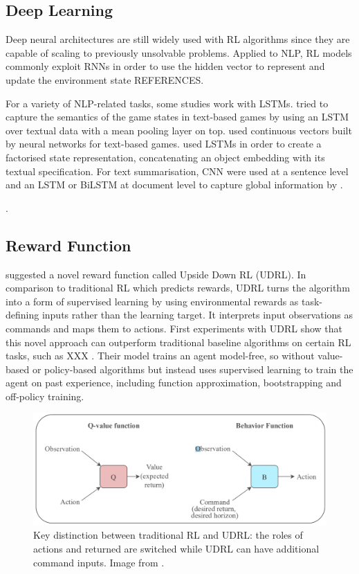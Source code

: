 \documentclass[11pt,a4paper]{article}
\begin{document}
\subsection{Deep Learning}
Deep neural architectures are still widely used with RL algorithms since they are capable of scaling to previously unsolvable problems. Applied to NLP, RL models commonly exploit RNNs in order to use the hidden vector to represent and update the environment state REFERENCES. 

For a variety of NLP-related tasks, some studies work with LSTMs. \citet{narasimhan-etal-2016-improving} tried to capture the semantics of the game states in text-based games by using an LSTM over textual data with a mean pooling layer on top. \citet{he-etal-2016-deep-reinforcement} used continuous vectors built by neural networks for text-based games. \citet{narasimhan-2018} used LSTMs in order to create a factorised state representation, concatenating an object embedding with its textual specification. For text summarisation, CNN were used at a sentence level and an LSTM or BiLSTM at document level to capture global information by \citet{chen-bansal-2018-fast}. 

\citet{yasui-etal-2019, zhang-2018, li-etal-2016-deep, ranzato2015sequence}. 

\subsection{Reward Function}
\citet{schmidhuber2019reinforcement} suggested a novel reward function called Upside Down RL (UDRL). In comparison to traditional RL which predicts rewards, UDRL turns the algorithm into a form of supervised learning by using environmental rewards as task-defining inputs rather than the learning target. It interprets input observations as commands and maps them to actions. First experiments with UDRL show that this novel approach can outperform traditional baseline algorithms on certain RL tasks, such as XXX \citet{srivastava2019training}. Their model trains an agent model-free, so without value-based or policy-based algorithms but instead uses supervised learning to train the agent on past experience, including function approximation, bootstrapping and off-policy training.

\begin{figure}[ht]
\centering
\includegraphics[scale=.42]{img/udrl_graphic.PNG}
\caption{Key distinction between traditional RL and UDRL: the roles of actions and returned are switched while UDRL can have additional command inputs. Image from \citep{srivastava2019training}.}
\end{figure}
\end{document}
